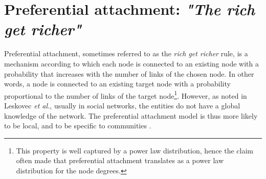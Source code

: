 \section{Preferential attachment: \emph{"The rich get richer"}}
\label{sec:burstiness}

Preferential attachment, sometimes referred to as the \textit{rich get richer} rule, is a mechanism according to which each node is connected to an existing node with a probability that increases with the number of links of the chosen node. In other words, a node is connected to an existing target node with a probability proportional to the number of links of the target node\footnote{This property is well captured by a power law distribution, hence the claim often made that preferential attachment translates as a power law distribution for the node degrees.}. However, as noted in Leskovec \textit{et al.}, usually in social networks, the entities do not have a global knowledge of the network. The preferential attachment model is thus more likely to be local, and to be specific to communities \cite{LeskovecBKT08}.

